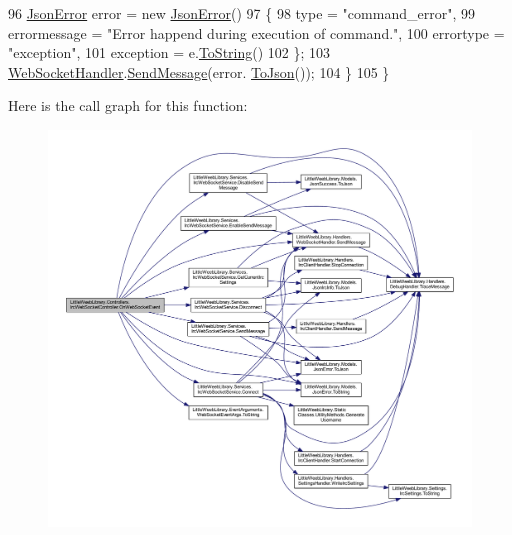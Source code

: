 \begin{DoxyCode}
96                 \mbox{\hyperlink{class_little_weeb_library_1_1_models_1_1_json_error}{JsonError}} error = \textcolor{keyword}{new} \mbox{\hyperlink{class_little_weeb_library_1_1_models_1_1_json_error}{JsonError}}()
97                 \{
98                     type = \textcolor{stringliteral}{"command\_error"},
99                     errormessage = \textcolor{stringliteral}{"Error happend during execution of command."},
100                     errortype = \textcolor{stringliteral}{"exception"},
101                     exception = e.\mbox{\hyperlink{class_little_weeb_library_1_1_models_1_1_json_error_ad7d5522c90119111d2e929f39e7f6d3c}{ToString}}()
102                 \};
103                 \mbox{\hyperlink{class_little_weeb_library_1_1_handlers_1_1_web_socket_handler}{WebSocketHandler}}.\mbox{\hyperlink{class_little_weeb_library_1_1_handlers_1_1_web_socket_handler_a1de289d54d665a32c93478c68d3e6ad0}{SendMessage}}(error.
      \mbox{\hyperlink{class_little_weeb_library_1_1_models_1_1_json_error_a0e3e7dd2e2990404b7f0461742b23440}{ToJson}}());
104             \}    
105         \}
\end{DoxyCode}
Here is the call graph for this function\+:\nopagebreak
\begin{figure}[H]
\begin{center}
\leavevmode
\includegraphics[width=350pt]{class_little_weeb_library_1_1_controllers_1_1_irc_web_socket_controller_a5ea966dddf1e0a082dd5ec28f6ace3ab_cgraph}
\end{center}
\end{figure}


